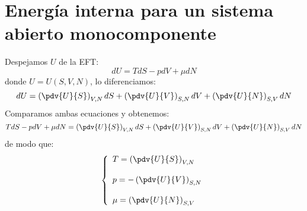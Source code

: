 \documentclass[../main]{subfiles}
\begin{document}
\section{Energía interna para un sistema abierto monocomponente}
Despejamos $U$ de la EFT:
\begin{equation}
    dU=TdS-pdV+\mu dN
\end{equation}
donde $U=U(S,V,N)$, lo diferenciamos:
\begin{equation}
    dU=\left( \pdv{U}{S} \right)_{V,N}dS+\left(\pdv{U}{V}\right)_{S,N}dV+\left( \pdv{U}{N}\right)_{S,V}dN
\end{equation}
Comparamos ambas ecuaciones y obtenemos:
\begin{equation}
    TdS-pdV+\mu dN=\left( \pdv{U}{S} \right)_{V,N}dS+\left(\pdv{U}{V}\right)_{S,N}dV+\left( \pdv{U}{N}\right)_{S,V}dN
\end{equation}
de modo que:
\begin{equation}
    \left\{
    \begin{array}{l}
        T=\displaystyle \left( \pdv{U}{S} \right)_{V,N} \\ \\
        p=-\displaystyle \left(\pdv{U}{V}\right)_{S,N}  \\ \\
        \mu=\displaystyle \left( \pdv{U}{N}\right)_{S,V}
    \end{array}
    \right.
\end{equation}
\end{document}
